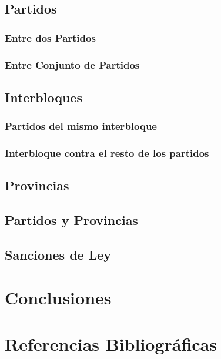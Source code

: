 \documentclass{endm}
\begin{document}
\subsection{Partidos}

\subsubsection{Entre dos Partidos}

\subsubsection{Entre Conjunto de Partidos}


\subsection{Interbloques}

\subsubsection{Partidos del mismo interbloque}

\subsubsection{Interbloque contra el resto de los partidos}

\subsection{Provincias}

\subsection{Partidos y Provincias}
\subsection{Sanciones de Ley}

\section{Conclusiones}

\section{Referencias Bibliográficas}
\end{document}
